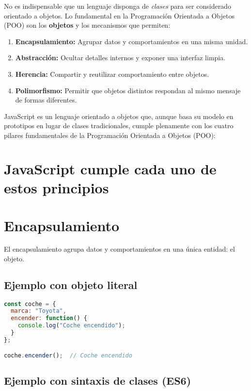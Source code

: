 \documentclass[12pt]{article}
\begin{document}
No es indispensable que un lenguaje disponga de \emph{clases} para ser considerado orientado a objetos. Lo fundamental en la Programación Orientada a Objetos (POO) son los \textbf{objetos} y los mecanismos que permiten:

\begin{enumerate}
  \item \textbf{Encapsulamiento:} Agrupar datos y comportamientos en una misma unidad.
  \item \textbf{Abstracción:} Ocultar detalles internos y exponer una interfaz limpia.
  \item \textbf{Herencia:} Compartir y reutilizar comportamiento entre objetos.
  \item \textbf{Polimorfismo:} Permitir que objetos distintos respondan al mismo mensaje de formas diferentes.
\end{enumerate}

JavaScript es un lenguaje orientado a objetos que, aunque basa su modelo en prototipos en lugar de clases tradicionales, cumple plenamente con los cuatro pilares fundamentales de la Programación Orientada a Objetos (POO):

\section*{JavaScript cumple cada uno de estos principios}

\section{Encapsulamiento}

El encapsulamiento agrupa datos y comportamientos en una única entidad: el objeto.

\subsection*{Ejemplo con objeto literal}

\begin{lstlisting}[language=JavaScript]
const coche = {
  marca: "Toyota",
  encender: function() {
    console.log("Coche encendido");
  }
};

coche.encender();  // Coche encendido
\end{lstlisting}

\subsection*{Ejemplo con sintaxis de clases (ES6)}
\end{document}
